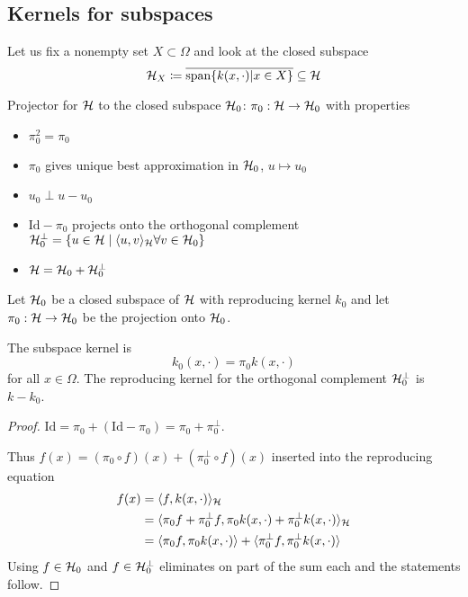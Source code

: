 \subsection{Kernels for subspaces}

Let us fix a nonempty set $X\subset\Omega$ and look at 
the closed subspace 
\[\mathcal{H}_X\coloneqq \overline{\text{span}\{k(x,\cdot)|x\in X\}}\subseteq\mathcal{H}\]

Projector for $\mathcal{H}$ to the closed subspace $\mathcal{H}_0$: $\pi_0:\mathcal{H}\to\mathcal{H}_0$ with properties 
\begin{itemize}
    \item $\pi_0^2=\pi_0$
    \item $\pi_0$ gives unique best approximation in $\mathcal{H}_0$, $u\mapsto u_0$ %
    \item $u_0\perp u-u_0$
    \item $\text{Id}-\pi_0$ projects onto the orthogonal complement $\mathcal{H}_0^\perp=\{u\in\mathcal{H}\mid \langle u,v\rangle_{\mathcal{H}}\forall v\in \mathcal{H}_0\}$
    \item $\mathcal{H}=\mathcal{H}_0+\mathcal{H}_0^\perp$
\end{itemize}

\begin{theorem}\label{thm:1.15}
    Let $\mathcal{H}_0$ be a closed subspace of $\mathcal{H}$ with reproducing kernel $k_0$ and 
    let $\pi_0:\mathcal{H}\to\mathcal{H}_0$ be the projection onto $\mathcal{H}_0$.

    The subspace kernel is 
    \[k_0(x,\cdot)= \pi_0k(x,\cdot)\]
    for all $x\in\Omega$. The reproducing kernel for the orthogonal 
    complement $\mathcal{H}_0^\perp$ is $k-k_0$.
\end{theorem}

\begin{proof}
    $\text{Id}=\pi_0+(\text{Id}-\pi_0)=\pi_0+\pi_0^\perp$.

    Thus $f(x)=(\pi_0\circ f)(x)+(\pi_0^\perp\circ f)(x)$ inserted into the
    reproducing equation 
    \begin{align*}
        f(x)&=\langle f,k(x,\cdot)\rangle_{\mathcal{H}}\\
        &=\langle \pi_0f+\pi_0^\perp f,\pi_0k(x,\cdot)+\pi_0^\perp k(x,\cdot)\rangle_{\mathcal{H}} \\
        &=\langle \pi_0 f,\pi_0 k(x,\cdot)\rangle+\langle \pi_0^\perp f,\pi_0^\perp k(x,\cdot)\rangle
    \end{align*}
    Using $f\in \mathcal{H}_0$ and $f\in \mathcal{H}_0^\perp$ eliminates on part of the sum each and the statements follow.
\end{proof}

